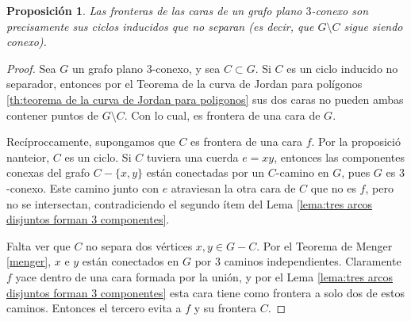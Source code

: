 \documentclass[12pt]{report}
\theoremstyle{plain}
\newtheorem{proposition}[theorem]{Proposición}
\theoremstyle{definition}
\begin{document}
\begin{proposition}\label{proposition:las fronteras de las caras de un grafo plano 3-conexo son precisamente sus ciclos inducidos que no separan}
Las fronteras de las caras de un grafo plano $3$-conexo son precisamente sus ciclos inducidos que no separan (es decir, que $G \setminus C$ sigue siendo conexo).
\end{proposition}
\begin{proof}
Sea $G$ un grafo plano $3$-conexo, y sea $C \subset G$. Si $C$ es un ciclo inducido no separador, entonces por el Teorema de la curva de Jordan para polígonos \ref{th:teorema de la curva de Jordan para poligonos} sus dos caras no pueden ambas contener puntos de $G \setminus C$. Con lo cual, es frontera de una cara de $G$.

Recíproccamente, supongamos que $C$ es frontera de una cara $f$. Por la proposició nanteior, $C$ es un ciclo. Si $C$ tuviera una cuerda $e = xy$, entonces las componentes conexas del grafo $C - \{x,y\}$ están conectadas por un $C$-camino en $G$, pues $G$ es $3$-conexo. Este camino junto con $e$ atraviesan la otra cara de $C$ que no es $f$, pero no se intersectan, contradiciendo el segundo ítem del Lema \ref{lema:tres arcos disjuntos forman 3 componentes}.

Falta ver que $C$ no separa dos vértices $x,y \in G - C$. Por el Teorema de Menger \ref{menger}, $x$ e $y$ están conectados en $G$ por $3$ caminos independientes. Claramente $f$ yace dentro de una cara formada por la unión, y por el Lema \ref{lema:tres arcos disjuntos forman 3 componentes} esta cara tiene como frontera a solo dos de estos caminos. Entonces el tercero evita a $f$ y su frontera $C$.
\end{proof}
\end{document}
